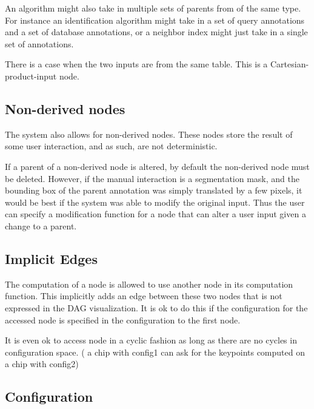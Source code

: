             An algorithm might also take in multiple sets of parents
              from of the same type.
            For instance an identification algorithm might take in a
              set of query annotations and a set of database
              annotations, or a neighbor index might just take in a
              single set of annotations.

            There is a case when the two inputs are from the same
              table.
            This is a Cartesian-product-input node.

        \subsection{Non-derived nodes}

            The system also allows for non-derived nodes.
            These nodes store the result of some user interaction, and
              as such, are not deterministic.

            If a parent of a non-derived node is altered, by default
              the non-derived node must be deleted.
            However, if the manual interaction is a segmentation mask,
              and the bounding box of the parent annotation was simply
              translated by a few pixels, it would be best if the system
              was able to modify the original input.
            Thus the user can specify a modification function for a
              node that can alter a user input given a change to a
              parent.

        \subsection{Implicit Edges}

            The computation of a node is allowed to use another node
              in its computation function.
            This implicitly adds an edge between these two nodes that
              is not expressed in the DAG visualization.
            It is ok to do this if the configuration for the accessed
              node is specified in the configuration to the first node.

            It is even ok to access node in a cyclic fashion as long
              as there are no cycles in configuration space.
            (\ie{} a chip with config1 can ask for the keypoints
              computed on a chip with config2)
        
        \subsection{Configuration}

